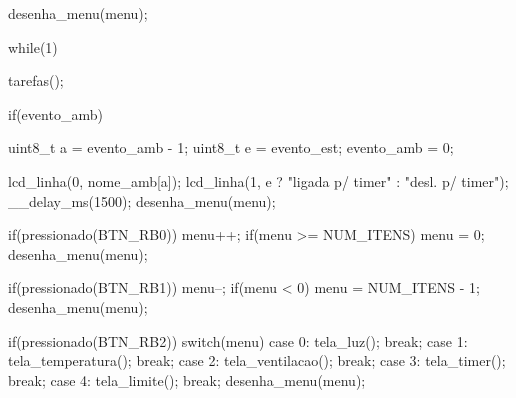 {    desenha_menu(menu);

    while(1)
    {
        tarefas();

        if(evento_amb)
        {
            uint8_t a = evento_amb - 1;
            uint8_t e = evento_est;
            evento_amb = 0;

            lcd_linha(0, nome_amb[a]);
            lcd_linha(1, e ? "ligada p/ timer" : "desl. p/ timer");
            __delay_ms(1500);
            desenha_menu(menu);
        }

        if(pressionado(BTN_RB0))
        {
            menu++;
            if(menu >= NUM_ITENS)
                menu = 0;
            desenha_menu(menu);
        }

        if(pressionado(BTN_RB1))
        {
            menu--;
            if(menu < 0)
                menu = NUM_ITENS - 1;
            desenha_menu(menu);
        }

        if(pressionado(BTN_RB2))
        {
            switch(menu)
            {
                case 0: tela_luz();         break;
                case 1: tela_temperatura(); break;
                case 2: tela_ventilacao();  break;
                case 3: tela_timer();       break;
                case 4: tela_limite();      break;
            }
            desenha_menu(menu);
        }
    }
}
